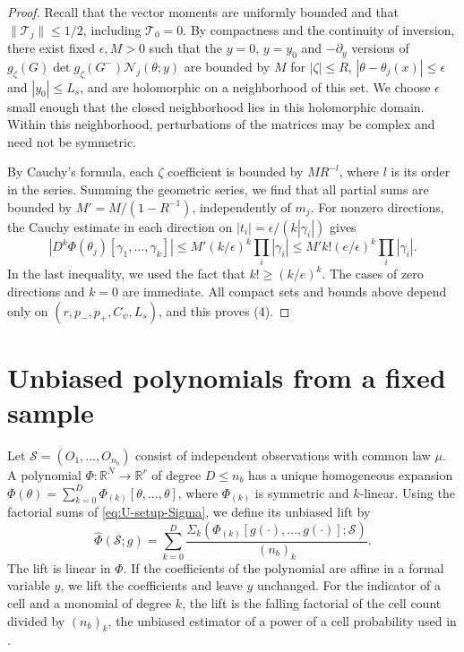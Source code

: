 \begin{proof}
Recall that the vector moments are uniformly bounded and that
$\|\mathcal T_j\|\le1/2$, including $\mathcal T_0=0$.
By compactness and the continuity of inversion, there exist fixed
$\epsilon,M>0$ such that the $y=0$, $y=y_0$ and $-\partial_y$
versions of $g_\zeta(G)\det g_\zeta(G^-)\mathcal N_j(\theta;y)$
are bounded by $M$
for $|\zeta|\le R$, $|\theta-\theta_j(x)|\le\epsilon$ and
$|y_0|\le L_s$, and are holomorphic on a neighborhood of this set.
We choose $\epsilon$ small enough that the closed neighborhood lies
in this holomorphic domain. Within this neighborhood, perturbations of the matrices may be
complex and need not be symmetric.

By Cauchy's formula, each $\zeta$ coefficient is bounded by
$MR^{-l}$, where $l$ is its order in the series. Summing the geometric series, we find that all partial sums
are bounded by $M'=M/(1-R^{-1})$, independently of $m_j$.
For nonzero directions, the Cauchy estimate in each direction on
$|t_i|=\epsilon/(k|\gamma_i|)$ gives
\[
 |D^k\Phi(\theta_j)[\gamma_1,\ldots,\gamma_k]|
 \le M'(k/\epsilon)^k\prod_i|\gamma_i|
 \le M'k!(e/\epsilon)^k\prod_i|\gamma_i|.
\]
In the last inequality, we used the fact that $k!\ge(k/e)^k$. The cases of
zero directions and $k=0$ are immediate. All compact sets and bounds
above depend only on $(r,p_-,p_+,C_\psi,L_s)$, and this proves (4).
\end{proof}
\section{Unbiased polynomials from a fixed sample}\label{sec:U-factorial}

Let $\mathcal S=(O_1,\dots,O_{n_b})$ consist of independent observations
with common law $\mu$. A polynomial
$\Phi:\mathbb R^N\to\mathbb R^r$ of degree $D\le n_b$ has a unique
homogeneous expansion
$\Phi(\theta)=\sum_{k=0}^D\Phi_{(k)}[\theta,\dots,\theta]$,
where $\Phi_{(k)}$ is symmetric and $k$-linear. Using the factorial sums
of \eqref{eq:U-setup-Sigma}, we define its unbiased lift by
\begin{equation}\label{eq:U6-hat}
 \widehat\Phi(\mathcal S;g)
 =\sum_{k=0}^D\frac{\Sigma_k(
       \Phi_{(k)}[g(\cdot),\dots,g(\cdot)];\mathcal S)}{(n_b)_k}.
\end{equation}
The lift is linear in $\Phi$. If the coefficients of the polynomial are
affine in a formal variable $y$, we lift the coefficients and leave $y$
unchanged. For the indicator of a cell and a monomial of degree $k$,
the lift is the falling factorial of the cell count divided by
$(n_b)_k$, the unbiased estimator of a power of a cell probability used
in \cite[equation~(21)]{JiaoEtAl2015}.

